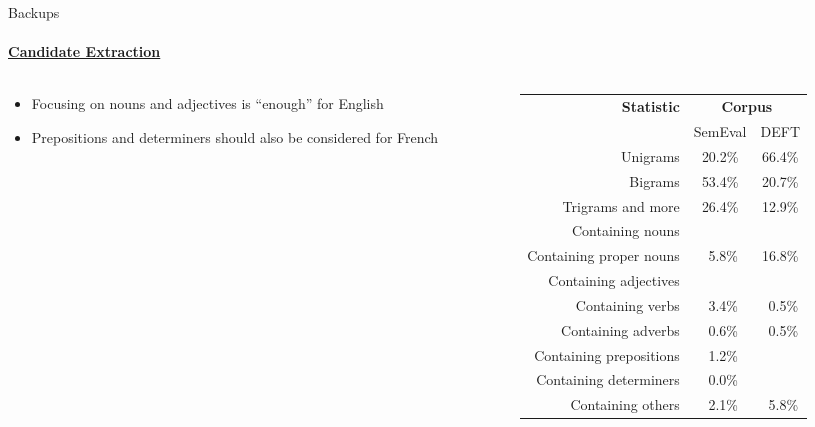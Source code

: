   \begin{frame}[label=candidate_extraction_backup]{Backups}
    \framesubtitle{\hyperlink{topicrank}{Candidate Extraction}}

    \begin{columns}
      \begin{column}{0.45\textwidth}
        \begin{itemize}
          \item{Focusing on nouns and adjectives is ``enough'' for English}
          \item{Prepositions and determiners should also be considered for
                French}
        \end{itemize}
      \end{column}

      \begin{column}{0.55\textwidth}
        \begin{center}
          \scriptsize
          \begin{tabular}{rcc}
            \toprule
            \multirow{2}{*}[-2pt]{\textbf{Statistic}} & \multicolumn{2}{c}{\textbf{Corpus}}\\
            \cmidrule{2-3}
            & SemEval & DEFT\\
            \midrule
            \addlinespace[1.5\defaultaddspace]
            Unigrams & 20.2\% & 66.4\%\\
            Bigrams & 53.4\% & 20.7\%\\
            Trigrams and more & 26.4\% & 12.9\%\\
            \addlinespace[.75\defaultaddspace]
            Containing nouns & \cellcolor{pink}{95.9\%} & \cellcolor{pink}{79.3\%}\\
            Containing proper nouns & $~~$5.8\% & 16.8\%\\
            Containing adjectives & \cellcolor{pink}{40.5\%} & \cellcolor{pink}{28.8\%}\\
            Containing verbs & $~~$3.4\% & $~~$0.5\%\\
            Containing adverbs & $~~$0.6\% & $~~$0.5\%\\
            Containing prepositions & $~~$1.2\% & \cellcolor{cyan!20}{12.7\%}\\
            Containing determiners & $~~$0.0\% & \cellcolor{cyan!20}{$~~$8.1\%}\\
            Containing others & $~~$2.1\% & $~~$5.8\%\\
            \bottomrule
          \end{tabular}
        \end{center}
      \end{column}
    \end{columns}
  \end{frame}

